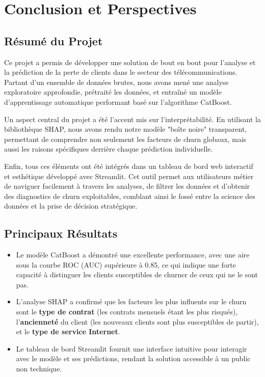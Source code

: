 \chapter{Conclusion et Perspectives}
\minitoc

\section{Résumé du Projet}
Ce projet a permis de développer une solution de bout en bout pour l'analyse et la prédiction de la perte de clients dans le secteur des télécommunications. Partant d'un ensemble de données brutes, nous avons mené une analyse exploratoire approfondie, prétraité les données, et entraîné un modèle d'apprentissage automatique performant basé sur l'algorithme CatBoost.

Un aspect central du projet a été l'accent mis sur l'interprétabilité. En utilisant la bibliothèque SHAP, nous avons rendu notre modèle "boîte noire" transparent, permettant de comprendre non seulement les facteurs de churn globaux, mais aussi les raisons spécifiques derrière chaque prédiction individuelle.

Enfin, tous ces éléments ont été intégrés dans un tableau de bord web interactif et esthétique développé avec Streamlit. Cet outil permet aux utilisateurs métier de naviguer facilement à travers les analyses, de filtrer les données et d'obtenir des diagnostics de churn exploitables, comblant ainsi le fossé entre la science des données et la prise de décision stratégique.

\section{Principaux Résultats}
\begin{itemize}
    \item Le modèle CatBoost a démontré une excellente performance, avec une aire sous la courbe ROC (AUC) supérieure à 0.85, ce qui indique une forte capacité à distinguer les clients susceptibles de churner de ceux qui ne le sont pas.
    \item L'analyse SHAP a confirmé que les facteurs les plus influents sur le churn sont le \textbf{type de contrat} (les contrats mensuels étant les plus risqués), l'\textbf{ancienneté} du client (les nouveaux clients sont plus susceptibles de partir), et le \textbf{type de service Internet}.
    \item Le tableau de bord Streamlit fournit une interface intuitive pour interagir avec le modèle et ses prédictions, rendant la solution accessible à un public non technique.
\end{itemize}

